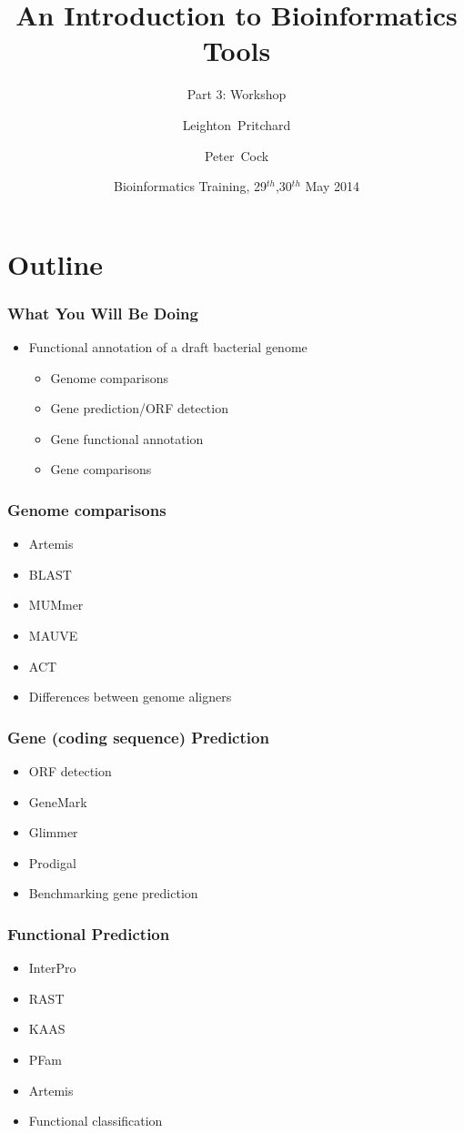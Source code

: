 \documentclass[table]{beamer}
\title[Intro to Bioinformatics] %
{An Introduction to Bioinformatics Tools}
\subtitle{Part 3: Workshop}
\author[Pritchard, Cock] %
{Leighton~Pritchard \and Peter~Cock}
\institute[The James Hutton Institute] %
{
  Information and Computational Sciences\\
  The James Hutton Institute
}
\date[May 2014] %
{Bioinformatics Training, 29$^{th}$,30$^{th}$ May 2014}
\begin{document}
  \frame[plain]{\titlepage}
  
  \section{Outline}
 
    \begin{frame}
     \frametitle{What You Will Be Doing}
     \begin{itemize}
       \item Functional annotation of a draft bacterial genome
       \begin{itemize}
         \item Genome comparisons
         \item Gene prediction/ORF detection
         \item Gene functional annotation
         \item Gene comparisons
       \end{itemize}
     \end{itemize}
    \end{frame}
    
    \begin{frame}
     \frametitle{Genome comparisons}
     \begin{itemize}
       \item Artemis
       \item BLAST
       \item MUMmer
       \item MAUVE
       \item ACT
       \item Differences between genome aligners
     \end{itemize}
    \end{frame}

    \begin{frame}
     \frametitle{Gene (coding sequence) Prediction}
     \begin{itemize}
       \item ORF detection
       \item GeneMark
       \item Glimmer
       \item Prodigal
       \item Benchmarking gene prediction
     \end{itemize}
    \end{frame}

    \begin{frame}
     \frametitle{Functional Prediction}
     \begin{itemize}
       \item InterPro
       \item RAST
       \item KAAS
       \item PFam
       \item Artemis
       \item Functional classification
     \end{itemize}
    \end{frame}
    
\end{document}
